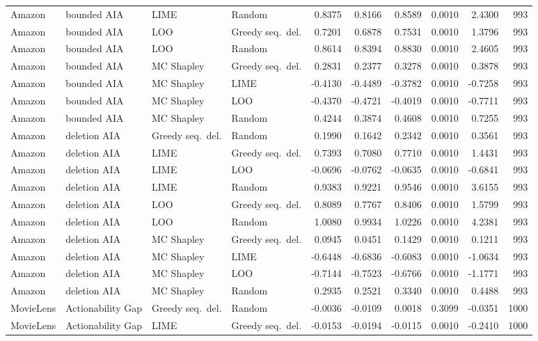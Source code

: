 \begin{longtable}{@{}p{}p{}p{}p{}rrrrrr@{}}
Amazon & bounded AIA & LIME & Random & 0.8375 & 0.8166 & 0.8589 & 0.0010 & 2.4300 & 993 \\
Amazon & bounded AIA & LOO & Greedy seq.\ del. & 0.7201 & 0.6878 & 0.7531 & 0.0010 & 1.3796 & 993 \\
Amazon & bounded AIA & LOO & Random & 0.8614 & 0.8394 & 0.8830 & 0.0010 & 2.4605 & 993 \\
Amazon & bounded AIA & MC Shapley & Greedy seq.\ del. & 0.2831 & 0.2377 & 0.3278 & 0.0010 & 0.3878 & 993 \\
Amazon & bounded AIA & MC Shapley & LIME & -0.4130 & -0.4489 & -0.3782 & 0.0010 & -0.7258 & 993 \\
Amazon & bounded AIA & MC Shapley & LOO & -0.4370 & -0.4721 & -0.4019 & 0.0010 & -0.7711 & 993 \\
Amazon & bounded AIA & MC Shapley & Random & 0.4244 & 0.3874 & 0.4608 & 0.0010 & 0.7255 & 993 \\
Amazon & deletion AIA & Greedy seq.\ del. & Random & 0.1990 & 0.1642 & 0.2342 & 0.0010 & 0.3561 & 993 \\
Amazon & deletion AIA & LIME & Greedy seq.\ del. & 0.7393 & 0.7080 & 0.7710 & 0.0010 & 1.4431 & 993 \\
Amazon & deletion AIA & LIME & LOO & -0.0696 & -0.0762 & -0.0635 & 0.0010 & -0.6841 & 993 \\
Amazon & deletion AIA & LIME & Random & 0.9383 & 0.9221 & 0.9546 & 0.0010 & 3.6155 & 993 \\
Amazon & deletion AIA & LOO & Greedy seq.\ del. & 0.8089 & 0.7767 & 0.8406 & 0.0010 & 1.5799 & 993 \\
Amazon & deletion AIA & LOO & Random & 1.0080 & 0.9934 & 1.0226 & 0.0010 & 4.2381 & 993 \\
Amazon & deletion AIA & MC Shapley & Greedy seq.\ del. & 0.0945 & 0.0451 & 0.1429 & 0.0010 & 0.1211 & 993 \\
Amazon & deletion AIA & MC Shapley & LIME & -0.6448 & -0.6836 & -0.6083 & 0.0010 & -1.0634 & 993 \\
Amazon & deletion AIA & MC Shapley & LOO & -0.7144 & -0.7523 & -0.6766 & 0.0010 & -1.1771 & 993 \\
Amazon & deletion AIA & MC Shapley & Random & 0.2935 & 0.2521 & 0.3340 & 0.0010 & 0.4488 & 993 \\
MovieLens & Actionability Gap & Greedy seq.\ del. & Random & -0.0036 & -0.0109 & 0.0018 & 0.3099 & -0.0351 & 1000 \\
MovieLens & Actionability Gap & LIME & Greedy seq.\ del. & -0.0153 & -0.0194 & -0.0115 & 0.0010 & -0.2410 & 1000 \\

\end{longtable}
